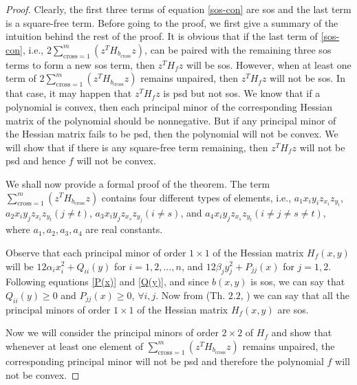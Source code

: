 \documentclass[12pt]{elsarticle}
\theoremstyle{definition}
\begin{document}
\begin{proof}
Clearly, the first three terms of equation \eqref{sos-con} are sos and the last term is a square-free term. Before going to the proof, we first give a summary of the intuition behind the rest of the proof. It is obvious that if the last term of \eqref{sos-con}, i.e., $2\sum_{\text{cross}=1}^m(z^TH_{b_{\text{cross}}}z)$, can be paired with the remaining three sos terms to form a new sos term, then $z^TH_fz$ will be sos. However, when at least one term of $2\sum_{\text{cross}=1}^m(z^TH_{b_{\text{cross}}}z)$ remains unpaired, then $z^TH_fz$ will not be sos. In that case, it may happen that $z^TH_fz$ is psd but not sos. We know that if a polynomial is convex, then each principal minor of the corresponding Hessian matrix of the polynomial should be nonnegative. But if any principal minor of the Hessian matrix fails to be psd, then the polynomial will not be convex. We will show that if there is any square-free term remaining, then $z^TH_fz$ will not be psd and hence $f$ will not be convex.

We shall now provide a formal proof of the theorem. The term $\sum_{\text{cross}=1}^m(z^TH_{b_{\text{cross}}}z)$ contains four different types of elements, i.e., $a_1x_iy_iz_{x_i}z_{y_i}$, $a_2x_iy_jz_{x_i}z_{y_t}(j\neq t)$, $a_3x_iy_jz_{x_s}z_{y_j}(i\neq s)$, and $a_4x_iy_jz_{x_s}z_{y_t}(i\neq j\neq s\neq t)$, where $a_1,a_2,a_3,a_4$ are real constants.

Observe that each principal minor of order $1\times 1$ of the Hessian matrix $H_f(x,y)$ will be $12\alpha_ix_i^2 + Q_{ii}(y)$ for $i=1,2,\dots,n$, and $12\beta_jy_j^2 + P_{jj}(x)$ for $j=1,2$. Following equations \eqref{P(x)} and \eqref{Q(y)}, and since $b(x,y)$ is sos, we can say that $Q_{ii}(y)\geq 0$ and $P_{jj}(x)\geq 0$, $\forall i,j$. Now from (Th. $2.2$, \cite{ahmadi2023sums}) we can say that all the principal minors of order $1\times 1$ of the Hessian matrix $H_f(x,y)$ are sos.

Now we will consider the principal minors of order $2\times 2$ of $H_f$ and show that whenever at least one element of $\sum_{\text{cross}=1}^m(z^TH_{b_{\text{cross}}}z)$ remains unpaired, the corresponding principal minor will not be psd and therefore the polynomial $f$ will not be convex.


\end{proof}
\end{document}
